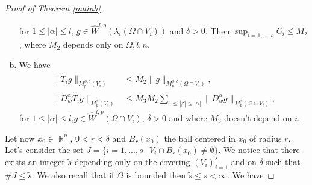 \documentclass[12pt]{article}
\theoremstyle{definition}
\DeclareMathOperator\rr{\mathbb{R}}
\begin{document}
\begin{proof}[Proof of Theorem \ref{mainh}]
\begin{enumerate}[a)]
for $1\le |\alpha|\le l$, $g \in \widehat W^{l,p}(\lambda_i(\Omega \cap V_i))$ and $\delta>0$. Then $\sup_{i=1,...,s} C_i \le M_2$, where $M_2$ depends only on $\Omega,l,n$.
\item We have
\begin{align*}
 \| \widetilde T_ig\|_{M_p^{\phi,\delta}(V_i)}&\le M_2 \|g\|_{M_p^{\phi,\delta}(\Omega \cap V_i)},\\
\| D^\alpha_w \widetilde T_ig\|_{M_p^\phi(V_i)} &\le   M_3M_2\sum_{1\le |\beta|\le|\alpha| }\| D^\alpha_wg\|_{M_p^\phi(\Omega \cap V_i)},
\end{align*}
for $1\le |\alpha|\le l$,$g \in \widehat W^{l,p}(\Omega \cap V_i)$, $\delta>0$ and where $M_3$ doesn't depend on $i$. 
\end{enumerate}
Let now $x_0 \in \rr^n$, $0<r<\delta$ and $B_r(x_0)$ the ball centered in $x_0$ of radius $r.$ Let's consider the set $J=\{ i=1,...,s \ | \ V_i \cap B_r(x_0) \neq \emptyset\}.$
We notice that there exists an integer $\widetilde s$ depending only on the covering $(V_i)_{i=1}^s$ and on $\delta$ such that $\# J\le \widetilde s.$ We also recall that if $\Omega$ is bounded then $\widetilde s\le s<\infty$. We have




\end{proof}
\end{document}
